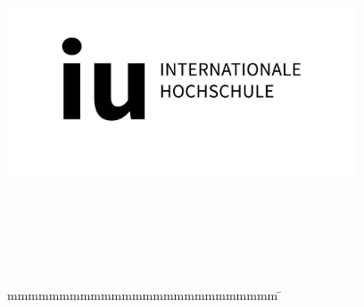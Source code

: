 
\begin{titlepage}
	\begin{center}
		\includegraphics[height=5cm]{images/cover/iu_Logo_D_black_RGB_horizontal.jpg}
	\end{center}
	\enlargethispage{20mm}
	\begin{center}

		\vspace*{12mm}	{\large\textbf {\documentTypePhrase}}\\


		\vspace*{12mm}	 \locationUniversity{} \studyType\\
		\vspace*{0mm}	\departmentPhrase{} \department\\

		\doublespacing{
			\vspace*{12mm}	{\LARGE\textbf \documentTitle }}\\
		
	\end{center}
	\vfill
	\begin{spacing}{1.2}
		\begin{tabbing}
			mmmmmmmmmmmmmmmmmmmmmmmmmm             \= \kill
            

\end{tabbing}
\end{spacing}
\end{titlepage}
